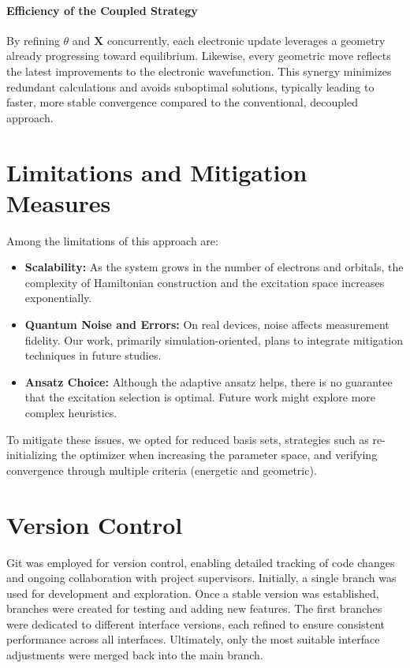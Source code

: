 \paragraph{Efficiency of the Coupled Strategy}
By refining \(\theta\) and \(\mathbf{X}\) concurrently, each electronic update leverages a geometry already progressing toward equilibrium. Likewise, every geometric move reflects the latest improvements to the electronic wavefunction. This synergy minimizes redundant calculations and avoids suboptimal solutions, typically leading to faster, more stable convergence compared to the conventional, decoupled approach.


\section{Limitations and Mitigation Measures}

Among the limitations of this approach are:
\begin{itemize}
    \item \textbf{Scalability:} As the system grows in the number of electrons and orbitals, the complexity of Hamiltonian construction and the excitation space increases exponentially.
    \item \textbf{Quantum Noise and Errors:} On real devices, noise affects measurement fidelity. Our work, primarily simulation-oriented, plans to integrate mitigation techniques in future studies.
    \item \textbf{Ansatz Choice:} Although the adaptive ansatz helps, there is no guarantee that the excitation selection is optimal. Future work might explore more complex heuristics.
\end{itemize}

To mitigate these issues, we opted for reduced basis sets, strategies such as re-initializing the optimizer when increasing the parameter space, and verifying convergence through multiple criteria (energetic and geometric).

\section{Version Control}
Git was employed for version control, enabling detailed tracking of code changes and ongoing collaboration with project supervisors. Initially, a single branch was used for development and exploration. Once a stable version was established, branches were created for testing and adding new features. The first branches were dedicated to different interface versions, each refined to ensure consistent performance across all interfaces. Ultimately, only the most suitable interface adjustments were merged back into the main branch.

